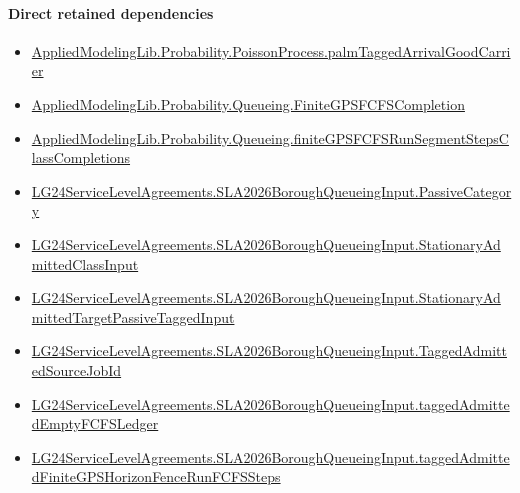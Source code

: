 \documentclass[10pt]{article}
\begin{document}
\paragraph{Direct retained dependencies}
\begin{itemize}\raggedright
\item \hyperlink{governing-declaration-ae13476c571ece6d}{Applied\allowbreak{}Modeling\allowbreak{}Lib.\allowbreak{}Probability.\allowbreak{}Poisson\allowbreak{}Process.\allowbreak{}palm\allowbreak{}Tagged\allowbreak{}Arrival\allowbreak{}Good\allowbreak{}Carrier}
\item \hyperlink{governing-declaration-73bff5fa8f16fe86}{Applied\allowbreak{}Modeling\allowbreak{}Lib.\allowbreak{}Probability.\allowbreak{}Queueing.\allowbreak{}Finite\allowbreak{}GPSFCFS\allowbreak{}Completion}
\item \hyperlink{governing-declaration-97ad968638007415}{Applied\allowbreak{}Modeling\allowbreak{}Lib.\allowbreak{}Probability.\allowbreak{}Queueing.\allowbreak{}finite\allowbreak{}GPSFCFS\allowbreak{}Run\allowbreak{}Segment\allowbreak{}Steps\allowbreak{}Class\allowbreak{}Completions}
\item \hyperlink{governing-declaration-abc91e26948cf0a3}{LG24\allowbreak{}Service\allowbreak{}Level\allowbreak{}Agreements.\allowbreak{}SLA2026\allowbreak{}Borough\allowbreak{}Queueing\allowbreak{}Input.\allowbreak{}Passive\allowbreak{}Category}
\item \hyperlink{governing-declaration-f3072ff54a3653c2}{LG24\allowbreak{}Service\allowbreak{}Level\allowbreak{}Agreements.\allowbreak{}SLA2026\allowbreak{}Borough\allowbreak{}Queueing\allowbreak{}Input.\allowbreak{}Stationary\allowbreak{}Admitted\allowbreak{}Class\allowbreak{}Input}
\item \hyperlink{governing-declaration-8796a25a610eaea9}{LG24\allowbreak{}Service\allowbreak{}Level\allowbreak{}Agreements.\allowbreak{}SLA2026\allowbreak{}Borough\allowbreak{}Queueing\allowbreak{}Input.\allowbreak{}Stationary\allowbreak{}Admitted\allowbreak{}Target\allowbreak{}Passive\allowbreak{}Tagged\allowbreak{}Input}
\item \hyperlink{governing-declaration-03f187b908407c39}{LG24\allowbreak{}Service\allowbreak{}Level\allowbreak{}Agreements.\allowbreak{}SLA2026\allowbreak{}Borough\allowbreak{}Queueing\allowbreak{}Input.\allowbreak{}Tagged\allowbreak{}Admitted\allowbreak{}Source\allowbreak{}Job\allowbreak{}Id}
\item \hyperlink{governing-declaration-a590b2e270de22df}{LG24\allowbreak{}Service\allowbreak{}Level\allowbreak{}Agreements.\allowbreak{}SLA2026\allowbreak{}Borough\allowbreak{}Queueing\allowbreak{}Input.\allowbreak{}tagged\allowbreak{}Admitted\allowbreak{}Empty\allowbreak{}FCFS\allowbreak{}Ledger}
\item \hyperlink{governing-declaration-4747861d7a105199}{LG24\allowbreak{}Service\allowbreak{}Level\allowbreak{}Agreements.\allowbreak{}SLA2026\allowbreak{}Borough\allowbreak{}Queueing\allowbreak{}Input.\allowbreak{}tagged\allowbreak{}Admitted\allowbreak{}Finite\allowbreak{}GPS\allowbreak{}Horizon\allowbreak{}Fence\allowbreak{}Run\allowbreak{}FCFS\allowbreak{}Steps}
\end{itemize}
\hypertarget{governing-declaration-0ea2bc5d4cf334d1}{}
\end{document}
